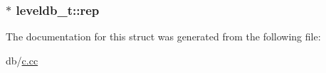 \subsubsection[{rep}]{$\ast$ leveldb\+\_\+t\+::rep}\label{structleveldb__t_af8f1950b2c676ccc37e4095f558261ad}


The documentation for this struct was generated from the following file\+:\begin{DoxyCompactItemize}
\item 
db/\hyperlink{c_8cc}{c.\+cc}\end{DoxyCompactItemize}
